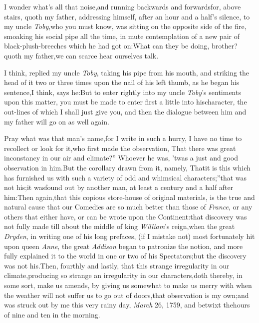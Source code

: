 \documentclass{article}
\begin{document}
\quad\tsh  I wonder what’s
all that noise,\break and running backwards and forwards\break for, above
stairs, quoth my father, addressing himself, after an hour and a\break
half’s silence, to my uncle \textit{Toby},\tsh  who
you must know, was sitting on the opposite side of the fire,
smoaking his social pipe all the time, in mute contemplation of a
new pair of black-plush-breeches\break
which he had got on:\tsk  What
can they be doing, brother?  quoth my father,\tsk\break  we can
scarce hear ourselves talk.

I think, replied my uncle \textit{Toby}, taking his pipe from his
mouth, and striking the head of it two or three times upon the nail
of his left thumb, as he began his sentence,\tsh  I think,
says he:\tsh\break  But to enter rightly into my uncle
\textit{Toby}’s sentiments upon this matter, you must be made
to enter first a little into his\break character, the out-lines of which
I shall just give you, and then the dialogue between
him and my father will go on as well again.\\

\tsk Pray what was that man’s name,\tsk\break  for I write in such a
hurry, I have no time to recollect or look for it,\tsh  who
first made the observation, \lqq That there was great
inconstancy in our air and climate?” Whoever he was,
’twas a just and good observation in him.\tsk  But the
corollary drawn from it, namely, \lqq That\break it is this which
has furnished us with such a variety of odd and whimsical
characters;”\tsk  that was not his;\tsk  it was\break found out
by another man, at least a century and a half after him:\tsk Then\break
again,\tsk  that this copious store-house of original materials,
is the true and natural cause that our Comedies are so much better
than those of \textit{France}, or any others that either have, or can
be wrote upon the Continent:\tsh  that discovery was not
fully made till about the middle of king \textit{William}’s
reign,\tsk  when the great \textit{Dryden}, in writing one of his
long prefaces, (if I mistake not) most fortunately hit upon\break
{}
queen \textit{Anne}, the great \textit{Addison} began to
patronize the notion, and more fully explained it to the world in
one or two of his Spectators;\tsk  but the discovery was not
his.\tsk  Then, fourthly and lastly, that this strange
irregularity in our climate,\break producing so strange an irregularity
in our characters,\tsh  doth thereby, in some sort, make us
amends, by giving us somewhat to make us merry with when the
weather will not suffer us to go out of doors,\tsk  that
observation is my own;\tsk\break  and was struck out by me this very
rainy day, \textit{March} 26, 1759, and betwixt the\break hours of nine and
ten in the morning.
\end{document}
